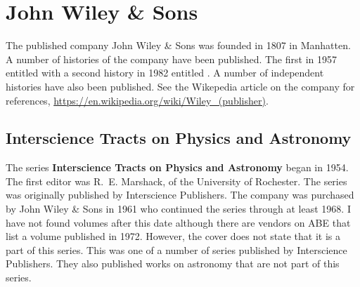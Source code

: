 
\section{John Wiley \& Sons}

The published company John Wiley \& Sons was founded in 1807 in
Manhatten. A number of histories of the company have been published.
The first in 1957 entitled  with a second history in
1982 entitled .  A number of independent histories have also been
published.  See the Wikepedia article on the company for references,
\url{https://en.wikipedia.org/wiki/Wiley_(publisher)}.

\subsection{Interscience Tracts on Physics and Astronomy}

The series \textbf{Interscience Tracts on Physics and Astronomy} began
in 1954. The first editor was R.~E. Marshack, of the University of
Rochester. The series was originally published by Interscience
Publishers. The company was purchased by John Wiley \& Sons in 1961
who continued the series through at least 1968. I have not found
volumes after this date although there are vendors on ABE that list a
volume published in 1972.  However, the cover does not state that it
is a part of this series.  This was one of a number of series
published by Interscience Publishers. They also published works on
astronomy that are not part of this series.

